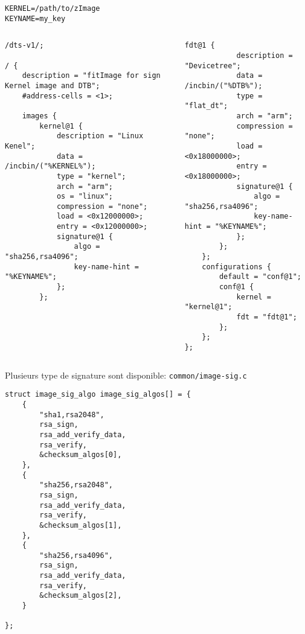 \documentclass[compress,aspectratio=169]{beamer}
\begin{document}
\begin{frame}[fragile]
\begin{columns}\begin{column}{0.2\textwidth}\end{column}\end{columns}
\begin{lstlisting}[style=shell,basicstyle=\tiny\ttfamily\color{white}]
KERNEL=/path/to/zImage
KEYNAME=my_key
\end{lstlisting}
\begin{columns}
\begin{column}{0.5\textwidth}
\begin{lstlisting}[style=shell,basicstyle=\tiny\ttfamily\color{white}]
/dts-v1/;

/ {
	description = "fitImage for sign Kernel image and DTB";
	#address-cells = <1>;

	images {
		kernel@1 {
			description = "Linux Kenel";
			data = /incbin/("%KERNEL%");
			type = "kernel";
			arch = "arm";
			os = "linux";
			compression = "none";
			load = <0x12000000>;
			entry = <0x12000000>;
			signature@1 {
				algo = "sha256,rsa4096";
				key-name-hint = "%KEYNAME%";
			};
		};
\end{lstlisting}
\end{column}
\begin{column}{0.5\textwidth}  
\begin{lstlisting}[style=shell,basicstyle=\tiny\ttfamily\color{white}]
		fdt@1 {
			description = "Devicetree";
			data = /incbin/("%DTB%");
			type = "flat_dt";
			arch = "arm";
			compression = "none";
			load = <0x18000000>;
			entry = <0x18000000>;
			signature@1 {
				algo = "sha256,rsa4096";
				key-name-hint = "%KEYNAME%";
			};
		};
	};
	configurations {
		default = "conf@1";
		conf@1 {
			kernel = "kernel@1";
			fdt = "fdt@1";
		};
	};
};
\end{lstlisting}
\end{column}
\end{columns}
\end{frame}

\begin{frame}[fragile]
Plusieurs type de signature sont disponible: \texttt{common/image-sig.c}
\begin{lstlisting}[style=shell,basicstyle=\tiny\ttfamily\color{white}]
struct image_sig_algo image_sig_algos[] = {
    {
        "sha1,rsa2048",
        rsa_sign,
        rsa_add_verify_data,
        rsa_verify,
        &checksum_algos[0],
    },
    {
        "sha256,rsa2048",
        rsa_sign,
        rsa_add_verify_data,
        rsa_verify,
        &checksum_algos[1],
    },
    {
        "sha256,rsa4096",
        rsa_sign,
        rsa_add_verify_data,
        rsa_verify,
        &checksum_algos[2],
    }

};
\end{lstlisting}
\end{frame}
\end{document}
